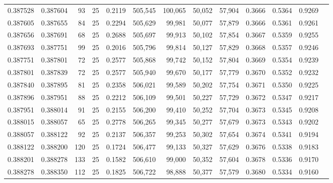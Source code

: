 \begin{tabular}{rrrrrrrrrrrrr}
0.387528 & 0.387604 &    93 &  25 &                                     0.2119 & 505,545 & 100,065 &  50,052 &  57,904 & 0.3666 & 0.5364 & 0.9269 \\
0.387605 & 0.387655 &    84 &  25 &                                     0.2294 & 505,629 &  99,981 &  50,077 &  57,879 & 0.3666 & 0.5361 & 0.9261 \\
0.387656 & 0.387691 &    68 &  25 &                                     0.2688 & 505,697 &  99,913 &  50,102 &  57,854 & 0.3667 & 0.5359 & 0.9255 \\
0.387693 & 0.387751 &    99 &  25 &                                     0.2016 & 505,796 &  99,814 &  50,127 &  57,829 & 0.3668 & 0.5357 & 0.9246 \\
0.387751 & 0.387801 &    72 &  25 &                                     0.2577 & 505,868 &  99,742 &  50,152 &  57,804 & 0.3669 & 0.5354 & 0.9239 \\
0.387801 & 0.387839 &    72 &  25 &                                     0.2577 & 505,940 &  99,670 &  50,177 &  57,779 & 0.3670 & 0.5352 & 0.9232 \\
0.387840 & 0.387895 &    81 &  25 &                                     0.2358 & 506,021 &  99,589 &  50,202 &  57,754 & 0.3671 & 0.5350 & 0.9225 \\
0.387896 & 0.387951 &    88 &  25 &                                     0.2212 & 506,109 &  99,501 &  50,227 &  57,729 & 0.3672 & 0.5347 & 0.9217 \\
0.387951 & 0.388014 &    91 &  25 &                                     0.2155 & 506,200 &  99,410 &  50,252 &  57,704 & 0.3673 & 0.5345 & 0.9208 \\
0.388015 & 0.388057 &    65 &  25 &                                     0.2778 & 506,265 &  99,345 &  50,277 &  57,679 & 0.3673 & 0.5343 & 0.9202 \\
0.388057 & 0.388122 &    92 &  25 &                                     0.2137 & 506,357 &  99,253 &  50,302 &  57,654 & 0.3674 & 0.5341 & 0.9194 \\
0.388122 & 0.388200 &   120 &  25 &                                     0.1724 & 506,477 &  99,133 &  50,327 &  57,629 & 0.3676 & 0.5338 & 0.9183 \\
0.388201 & 0.388278 &   133 &  25 &                                     0.1582 & 506,610 &  99,000 &  50,352 &  57,604 & 0.3678 & 0.5336 & 0.9170 \\
0.388278 & 0.388350 &   112 &  25 &                                     0.1825 & 506,722 &  98,888 &  50,377 &  57,579 & 0.3680 & 0.5334 & 0.9160 \\

\end{tabular}
